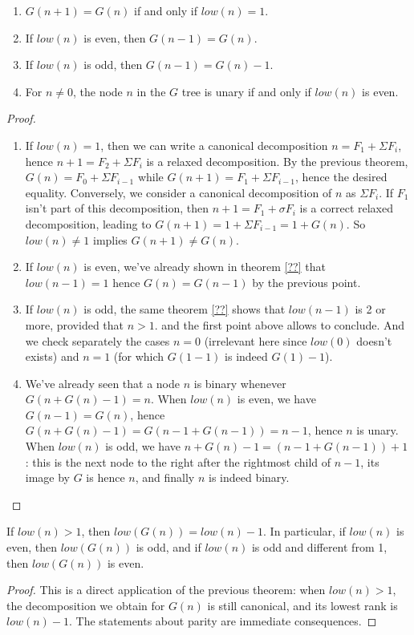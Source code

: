 \documentclass[a4paper,11pt]{article}
\begin{document}
\begin{theorem}\label{Gclass1}
\noindent
\begin{enumerate}
\item $G(n+1)=G(n)$ if and only if $low(n)=1$.
\item If $low(n)$ is even, then $G(n-1)=G(n)$.
\item If $low(n)$ is odd, then $G(n-1)=G(n)-1$.
\item For $n\neq 0$, the node $n$ in the $G$ tree
 is unary if and only if $low(n)$ is even.
\end{enumerate}
\end{theorem}
\begin{proof}
\noindent
\begin{enumerate}
\item
If $low(n)=1$, then we can write a canonical decomposition
$n=F_1+\Sigma F_i$, hence
$n+1=F_2+\Sigma F_i$ is a relaxed decomposition. By the previous
theorem, $G(n) = F_0 + \Sigma F_{i-1}$ while
$G(n+1) = F_1 + \Sigma F_{i-1}$, hence the desired equality.
Conversely, we consider a canonical decomposition of $n$ as $\Sigma F_i$.
If $F_1$ isn't part of this decomposition, then $n+1=F_1+\sigma F_i$
is a correct relaxed decomposition, leading to
$G(n+1)=1+\Sigma F_{i-1}=1+G(n)$. So $low(n)\neq 1$ implies
$G(n+1)\neq G(n)$.

\item If $low(n)$ is even, we've already shown in theorem \ref{??}
  that $low(n-1)=1$ hence $G(n)=G(n-1)$ by the previous point.

\item If $low(n)$ is odd, the same theorem
 \ref{??} shows that $low(n-1)$ is 2 or more, provided that $n>1$.
 and the first point above allows to conclude. And we check separately
 the cases $n=0$ (irrelevant here since $low(0)$ doesn't exists) and
 $n=1$ (for which $G(1-1)$ is indeed $G(1)-1$).

\item We've already seen that a node $n$ is binary whenever 
$G(n+G(n)-1) = n$. When $low(n)$ is even, we have
$G(n-1)=G(n)$, hence $G(n+G(n)-1) = G(n-1+G(n-1)) = n-1$, hence $n$ is
  unary. When $low(n)$ is odd, we have
$n+G(n)-1 = (n-1+G(n-1))+1$ : this is the next node to the right after
the rightmost child of $n-1$, its image by $G$ is hence $n$, and
finally $n$ is indeed binary.
\end{enumerate}
\end{proof}


\begin{theorem}\label{Glow}
If $low(n)>1$, then $low(G(n))=low(n)-1$. In particular,
if $low(n)$ is even, then $low(G(n))$ is odd, and if $low(n)$
is odd and different from 1, then $low(G(n))$ is even.
\end{theorem}
\begin{proof}
This is a direct application of the previous theorem:
when $low(n)>1$, the decomposition we obtain for $G(n)$ is
still canonical, and its lowest rank is $low(n)-1$.
The statements about parity are immediate consequences.
\end{proof}
\end{document}
